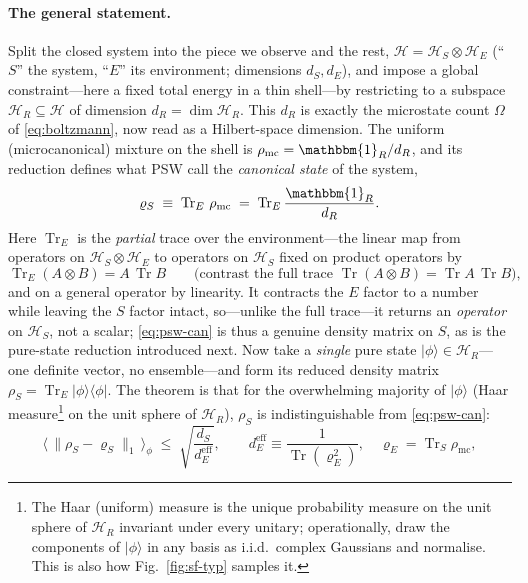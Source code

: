 \documentclass[11pt,a4paper]{article}
\theoremstyle{definition}
\begin{document}
\paragraph{The general statement.} Split the closed system into the piece we
observe and the rest, $\mathcal H=\mathcal H_S\otimes\mathcal H_E$ (``$S$'' the
system, ``$E$'' its environment; dimensions $d_S,d_E$), and impose a global
constraint---here a fixed total energy in a thin shell---by restricting to a
subspace $\mathcal H_R\subseteq\mathcal H$ of dimension $d_R=\dim\mathcal H_R$.
This $d_R$ is exactly the microstate count $\Omega$ of \eqref{eq:boltzmann}, now
read as a Hilbert-space dimension. The uniform (microcanonical) mixture on the
shell is $\rho_{\mathrm{mc}}=\mathbbm{1}_R/d_R$, and its reduction defines what PSW
call the \emph{canonical state} of the system,
\begin{equation}\label{eq:psw-can}
\varrho_S \;\equiv\; \operatorname{Tr}_E\,\rho_{\mathrm{mc}}
        \;=\; \operatorname{Tr}_E\frac{\mathbbm{1}_R}{d_R}.
\end{equation}
Here $\operatorname{Tr}_E$ is the \emph{partial} trace over the environment---the
linear map from operators on $\mathcal H_S\otimes\mathcal H_E$ to operators on
$\mathcal H_S$ fixed on product operators by
\begin{equation}\label{eq:ptrace}
\operatorname{Tr}_E(A\otimes B)=A\,\operatorname{Tr}B
\qquad\Big(\text{contrast the full trace }
\operatorname{Tr}(A\otimes B)=\operatorname{Tr}A\,\operatorname{Tr}B\Big),
\end{equation}
and on a general operator by linearity. It contracts the $E$ factor to a number
while leaving the $S$ factor intact, so---unlike the full trace---it returns an
\emph{operator} on $\mathcal H_S$, not a scalar; \eqref{eq:psw-can} is thus a
genuine density matrix on $S$, as is the pure-state reduction introduced next.
Now take a \emph{single} pure state $|\phi\rangle\in\mathcal H_R$---one definite
vector, no ensemble---and form its reduced density matrix
$\rho_S=\operatorname{Tr}_E|\phi\rangle\langle\phi|$. The theorem is that for the
overwhelming majority of $|\phi\rangle$ (Haar measure\footnote{The Haar
(uniform) measure is the unique probability measure on the unit sphere of
$\mathcal H_R$ invariant under every unitary; operationally, draw the components
of $|\phi\rangle$ in any basis as i.i.d.\ complex Gaussians and normalise. This
is also how Fig.~\ref{fig:sf-typ} samples it.} on the unit sphere of
$\mathcal H_R$), $\rho_S$ is indistinguishable from \eqref{eq:psw-can}:
\begin{equation}\label{eq:psw-bound}
\big\langle\,\lVert\rho_S-\varrho_S\rVert_1\,\big\rangle_{\phi}
 \;\le\; \sqrt{\frac{d_S}{d_E^{\mathrm{eff}}}},
\qquad
d_E^{\mathrm{eff}}\equiv\frac{1}{\operatorname{Tr}(\varrho_E^{2})},\quad
\varrho_E=\operatorname{Tr}_S\rho_{\mathrm{mc}},
\end{equation}
\end{document}
